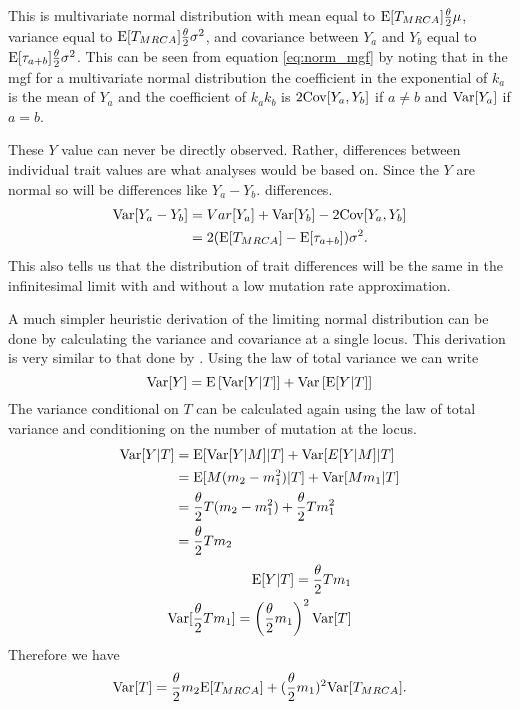 This is multivariate normal distribution with mean equal to $\mathrm{E}[T_{MRCA}] \frac{\theta}{2} \mu$,
variance equal to $\mathrm{E}[T_{MRCA}] \frac{\theta}{2} \sigma^2$, and covariance between $Y_a$ and $Y_b$
equal to $\mathrm{E}[\tau_{a+b}] \frac{\theta}{2} \sigma^2$. This can be seen from equation
\eqref{eq:norm_mgf} by noting that in the mgf for a multivariate normal
distribution the coefficient in the exponential of $k_a$ is the mean of $Y_a$
and the coefficient of $k_ak_b$ is $2\mathrm{Cov}[Y_a,Y_b]$ if $a\neq b$ and $\mathrm{Var}[Y_a]$
if $a=b$.

These $Y$ value can never be directly observed. Rather, differences between
individual trait values are what analyses would be based on. Since the $Y$ are
normal so will be differences like $Y_a-Y_b$. 
differences.
\begin{align*}
  \mathrm{Var}[Y_a-Y_b] &= Var[Y_a] + \mathrm{Var}[Y_b] - 2\mathrm{Cov}[Y_a,Y_b]\\
                &= 2(\mathrm{E}[T_{MRCA}] - \mathrm{E}[\tau_{a+b}])\sigma^2.
\end{align*}
This also tells us that the distribution of trait differences will be the same
in the infinitesimal limit with and without a low mutation rate approximation.

A much simpler heuristic derivation of the limiting normal distribution can be
done by calculating the variance and covariance at a single locus. This
derivation is very similar to that done by \citet{Schraiber2015}. Using the law
of total variance we can write
\begin{equation*}
  \mathrm{Var}[Y] = \mathrm{E}\left[\mathrm{Var}[Y|T]\right] +
  \mathrm{Var}\left[\mathrm{E}[Y|T]\right]
\end{equation*}
The variance conditional on $T$ can be calculated again using the law of total
variance and conditioning on the number of mutation at the locus. 
\begin{align*}
  \mathrm{Var}[Y|T] &= \mathrm{E}[\mathrm{Var}[Y|M]|T] + \mathrm{Var}[E[Y|M]|T]\\
            &= \mathrm{E}[M(m_2-m_1^2)|T] + \mathrm{Var}[Mm_1|T]\\
            &= \frac{\theta}{2} T (m_2-m_1^2) + \frac{\theta}{2} T m_1^2\\
            &= \frac{\theta}{2} T m_2
\end{align*}
\begin{align*}
  \mathrm{E}[Y|T] = \frac{\theta}{2} T m_1\\
  \mathrm{Var}[\frac{\theta}{2} T m_1] = \left( \frac{\theta}{2} m_1\right)^2\mathrm{Var}[T]
\end{align*}
Therefore we have
\begin{equation}
  \mathrm{Var}[T] = \frac{\theta}{2} m_2 \mathrm{E}[T_{MRCA}] + (\frac{\theta}{2} m_1)^2 \mathrm{Var}[T_{MRCA}].
\end{equation}

